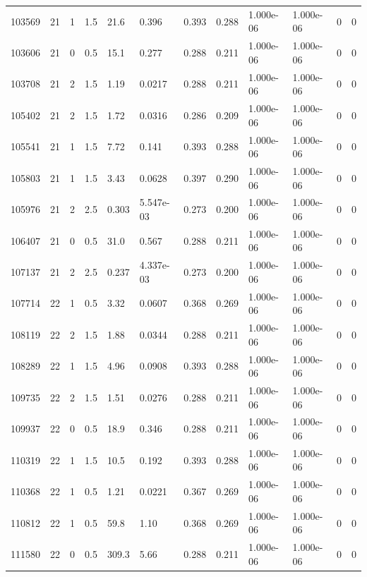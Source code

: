 \documentclass[preview]{standalone}
\begin{document}
{{{{{\begin{tabular}{L{1.2cm}C{1.2cm} C{0.3cm}C{0.5cm} C{1.4cm}C{1.4cm} C{1.4cm}C{1.4cm} C{1.6cm}C{1.6cm} C{1.6cm}C{1.6cm}}
  103569  &    21  & 1     & 1.5 &  21.6  & 0.396  &  0.393&   0.288& 1.000e-06 & 1.000e-06   &  0 & 0  \\ 
  103606  &    21  & 0     & 0.5 &  15.1  & 0.277  &  0.288&   0.211& 1.000e-06 & 1.000e-06   &  0 & 0  \\ 
  103708  &    21  & 2     & 1.5 &  1.19  & 0.0217  &  0.288&   0.211& 1.000e-06 & 1.000e-06   &  0 & 0  \\ 
  105402  &    21  & 2     & 1.5 &  1.72  & 0.0316  &  0.286&   0.209& 1.000e-06 & 1.000e-06   &  0 & 0  \\ 
  105541  &    21  & 1     & 1.5 &  7.72  & 0.141  &  0.393&   0.288& 1.000e-06 & 1.000e-06   &  0 & 0  \\ 
  105803  &    21  & 1     & 1.5 &  3.43  & 0.0628  &  0.397&   0.290& 1.000e-06 & 1.000e-06   &  0 & 0  \\ 
  105976  &    21  & 2     & 2.5 &  0.303  & 5.547e-03  &  0.273&   0.200& 1.000e-06 & 1.000e-06   &  0 & 0  \\ 
  106407  &    21  & 0     & 0.5 &  31.0  & 0.567  &  0.288&   0.211& 1.000e-06 & 1.000e-06   &  0 & 0  \\ 
  107137  &    21  & 2     & 2.5 &  0.237  & 4.337e-03  &  0.273&   0.200& 1.000e-06 & 1.000e-06   &  0 & 0  \\ 
  107714  &    22  & 1     & 0.5 &  3.32  & 0.0607  &  0.368&   0.269& 1.000e-06 & 1.000e-06   &  0 & 0  \\ 
  108119  &    22  & 2     & 1.5 &  1.88  & 0.0344  &  0.288&   0.211& 1.000e-06 & 1.000e-06   &  0 & 0  \\ 
  108289  &    22  & 1     & 1.5 &  4.96  & 0.0908  &  0.393&   0.288& 1.000e-06 & 1.000e-06   &  0 & 0  \\ 
  109735  &    22  & 2     & 1.5 &  1.51  & 0.0276  &  0.288&   0.211& 1.000e-06 & 1.000e-06   &  0 & 0  \\ 
  109937  &    22  & 0     & 0.5 &  18.9  & 0.346  &  0.288&   0.211& 1.000e-06 & 1.000e-06   &  0 & 0  \\ 
  110319  &    22  & 1     & 1.5 &  10.5  & 0.192  &  0.393&   0.288& 1.000e-06 & 1.000e-06   &  0 & 0  \\ 
  110368  &    22  & 1     & 0.5 &  1.21  & 0.0221  &  0.367&   0.269& 1.000e-06 & 1.000e-06   &  0 & 0  \\ 
  110812  &    22  & 1     & 0.5 &  59.8  & 1.10  &  0.368&   0.269& 1.000e-06 & 1.000e-06   &  0 & 0  \\ 
  111580  &    22  & 0     & 0.5 &  309.3  & 5.66  &  0.288&   0.211& 1.000e-06 & 1.000e-06   &  0 & 0  \\ 

\end{tabular}}}}}}
\end{document}

